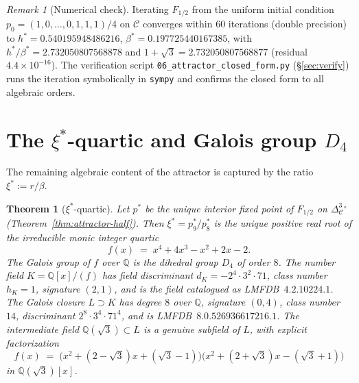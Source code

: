\documentclass[11pt,reqno]{amsart}
\theoremstyle{plain}
\newtheorem{theorem}{Theorem}
\theoremstyle{definition}
\theoremstyle{remark}
\newtheorem*{remark}{Remark}
\newcommand{\Q}{\mathbb{Q}}
\newcommand{\Cfour}{\mathcal{C}}
\begin{document}
\begin{remark}[Numerical check]\label{rem:hbr-numeric}
Iterating $F_{1/2}$ from the uniform initial condition
$p_{0} = (1,0,\dots,0,1,1,1)/4$ on $\Cfour$ converges within
$60$ iterations (double precision) to
$h^* = 0.540195948486216$, $\beta^* = 0.197725440167385$, with
$h^*/\beta^* = 2.732050807568878$ and $1+\sqrt{3} =
2.732050807568877$ (residual $4.4\times 10^{-16}$). The
verification script \texttt{06\_attractor\_closed\_form.py}
(\S\ref{sec:verify}) runs the iteration symbolically in
\texttt{sympy} and confirms the closed form to all algebraic
orders.
\end{remark}

\section{The $\xi^*$-quartic and Galois group $D_{4}$}\label{sec:galois}

The remaining algebraic content of the attractor is captured by
the ratio $\xi^* := r/\beta$.

\begin{theorem}[$\xi^*$-quartic]\label{thm:galois}
Let $p^*$ be the unique interior fixed point of $F_{1/2}$ on
$\Delta^{3}_{\Cfour}^{\circ}$ (Theorem~\ref{thm:attractor-half}).
Then $\xi^* = p^*_{9}/p^*_{8}$ is
the unique positive real root of the irreducible monic integer
quartic
\[
  f(x) \;=\; x^{4} + 4x^{3} - x^{2} + 2x - 2.
\]
The Galois group of $f$ over $\Q$ is the dihedral group
$D_{4}$ of order $8$. The number field $K = \Q[x]/(f)$ has
field discriminant $d_{K} = -2^{4}\cdot 3^{2}\cdot 71$,
class number $h_{K} = 1$, signature $(2, 1)$, and is the field
catalogued as LMFDB~$4.2.10224.1$. The Galois closure
$L\supset K$ has degree $8$ over $\Q$, signature $(0, 4)$, class
number $14$, discriminant $2^{8}\cdot 3^{4}\cdot 71^{4}$, and is
LMFDB~$8.0.526936617216.1$. The intermediate field
$\Q(\sqrt{3})\subset L$ is a genuine subfield of $L$, with
explicit factorization
\[
  f(x) \;=\; \bigl(x^{2}+(2-\sqrt{3})x+(\sqrt{3}-1)\bigr)
             \bigl(x^{2}+(2+\sqrt{3})x-(\sqrt{3}+1)\bigr)
\]
in $\Q(\sqrt{3})[x]$.
\end{theorem}
\end{document}

